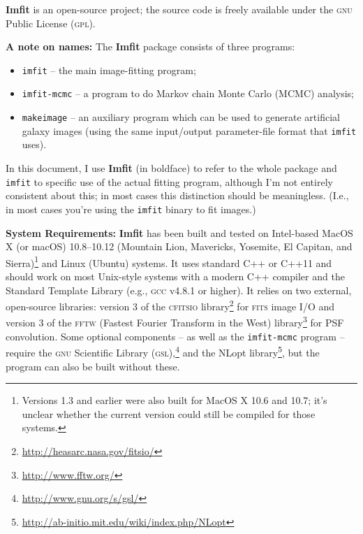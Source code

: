 \documentclass[10pt,a4paper,article]{memoir}
\newcommand{\imfit}{\textbf{Imfit}}
\newcommand{\Imfit}{\textbf{Imfit}}
\newcommand{\imfitprog}{\texttt{imfit}}
\newcommand{\imfitmcmc}{\texttt{imfit-mcmc}}
\newcommand{\makeimage}{\texttt{makeimage}}
\begin{document}
\Imfit{} is an open-source project; the source code is freely available
under the \textsc{gnu} Public License (\textsc{gpl}).


\bigskip

\textbf{A note on names:} The \imfit{} package consists of three programs:
\begin{itemize}
\item \imfitprog{} -- the main image-fitting program; \\
\item \imfitmcmc{} -- a program to do Markov chain Monte Carlo (MCMC) analysis; \\
\item \makeimage{} -- an auxiliary program which can be used to
generate artificial galaxy images (using the same input/output
parameter-file format that \imfitprog{} uses). \\
\end{itemize}
In this document, I use \imfit{} (in boldface) to refer to the whole
package and \imfitprog{} to specific use of the actual fitting program,
although I'm not entirely consistent about this; in most cases this
distinction should be meaningless. (I.e., in most cases you're using the
\imfitprog{} binary to fit images.)


\bigskip

\textbf{System Requirements:} \Imfit{} has been built and tested on
Intel-based MacOS X (or macOS) 10.8--10.12 (Mountain
Lion, Mavericks, Yosemite, El Capitan, and Sierra)\footnote{Versions 1.3
and earlier were also built for MacOS X 10.6 and 10.7; it's unclear
whether the current version could still be compiled for those systems.}
and Linux (Ubuntu) systems. It uses standard C++ or C++11 and should
work on most Unix-style systems with a modern C++ compiler and the
Standard Template Library (e.g., \textsc{gcc} v4.8.1 or higher). It
relies on two external, open-source libraries: version 3 of the
\textsc{cfitsio} library\footnote{\url{http://heasarc.nasa.gov/fitsio/}}
for \textsc{fits} image I/O and version 3 of the \textsc{fftw} (Fastest
Fourier Transform in the West)
library\footnote{\url{http://www.fftw.org/}} for PSF convolution. Some
optional components -- as well as the \imfitmcmc{} program -- require
the \textsc{gnu} Scientific Library
(\textsc{gsl}),\footnote{\url{http://www.gnu.org/s/gsl/}} and the NLopt
library\footnote{\url{http://ab-initio.mit.edu/wiki/index.php/NLopt}},
but the program can also be built without these.

\bigskip
\end{document}
